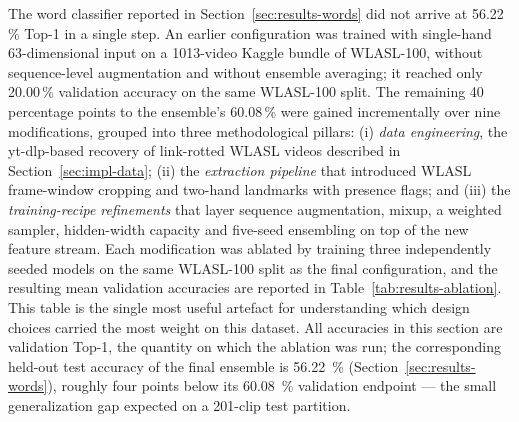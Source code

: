 The word classifier reported in Section~\ref{sec:results-words} did not
arrive at 56.22\,\% Top-1 in a single step. An earlier configuration
was trained with single-hand 63-dimensional input on a 1013-video
Kaggle bundle of WLASL-100, without sequence-level augmentation and
without ensemble averaging; it reached only 20.00\,\% validation
accuracy on the same WLASL-100 split. The remaining 40 percentage
points to the ensemble's 60.08\,\% were gained incrementally over
nine modifications, grouped into three methodological pillars: (i)
\emph{data engineering}, the yt-dlp-based recovery of link-rotted
WLASL videos described in Section~\ref{sec:impl-data}; (ii) the
\emph{extraction pipeline} that introduced WLASL frame-window
cropping and two-hand landmarks with presence flags; and (iii) the
\emph{training-recipe refinements} that layer sequence augmentation,
mixup, a weighted sampler, hidden-width capacity and five-seed
ensembling on top of the new feature stream. Each modification was
ablated by training three independently seeded models on the same
WLASL-100 split as the final configuration, and the resulting mean
validation accuracies are reported in
Table~\ref{tab:results-ablation}. This table is the single most
useful artefact for understanding which design choices carried the
most weight on this dataset. All accuracies in this section are
validation Top-1, the quantity on which the ablation was run; the
corresponding held-out test accuracy of the final ensemble is
\SI{56.22}{\percent} (Section~\ref{sec:results-words}), roughly four
points below its \SI{60.08}{\percent} validation endpoint --- the
small generalization gap expected on a 201-clip test partition.

